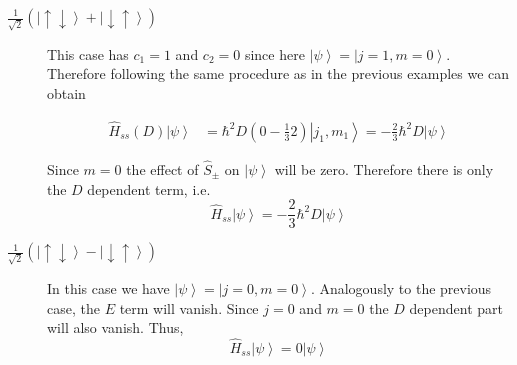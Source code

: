 \documentclass[A4paper, 12pt]{article}
\newcommand{\du}{\left | \downarrow\uparrow \right \rangle}
\newcommand{\ud}{\left | \uparrow\downarrow \right \rangle}
\newcommand{\mone}{\frac{1}{\sqrt{2}}\left( \ud + \du\right)}
\newcommand{\mmone}{\frac{1}{\sqrt{2}}\left( \ud - \du\right)}
\begin{document}
\begin{description}
\item[$\mone$] This case has $ c_{1}=1 $ and $ c_{2}=0 $ since here $ \left |
\psi  \right \rangle = \left | j=1, m=0 \right \rangle  $. Therefore following
the same procedure as in the previous examples we can obtain

\begin{align}
  \label{eq:D_part_spin_spin_general_calculation}
  \hat{H}_{ss}(D)
\left | \psi  \right \rangle &=
  \hbar^{2}D
  \left(0- \frac{1}{3} 2\right)
\left | j_{1}, m_{1} \right \rangle
=
- \frac{2}{3}
\hbar^{2}D
\left | \psi  \right \rangle
\end{align}

Since $ m=0 $ the effect of $ \hat{S}_{\pm} $ on $ \left | \psi  \right \rangle
$ will be zero. Therefore there is only the $ D $ dependent term, i.e.
\begin{equation}
  \label{eq:z-vector-eigenvalue-equation}
  \hat{H}_{ss}
\left | \psi  \right \rangle
=
- \frac{2}{3}
\hbar^{2}D
\left | \psi  \right \rangle
  \end{equation}


\item[$\mmone$]
  In this case we have $ \left | \psi  \right \rangle = \left | j=0, m=0 \right
\rangle  $. Analogously to the previous case, the $ E $ term will vanish. Since
$ j=0 $ and $ m=0 $ the $ D $ dependent part will also vanish. Thus,
  \begin{equation}
    \label{eq:z-vector-eigenvalue-equation}
    \hat{H}_{ss}
  \left | \psi  \right \rangle
  =
  0
\left | \psi  \right \rangle
  \end{equation}
\end{description}
\end{document}
